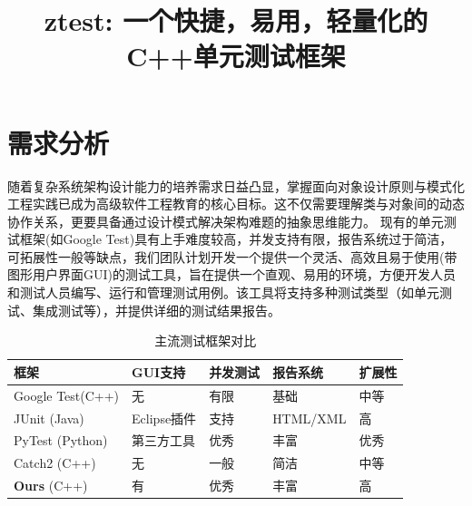 \documentclass[chinese]{article}
\title{\textbf{ztest}: 一个快捷，易用，轻量化的C++单元测试框架}
\begin{document}
\maketitle
\tableofcontents  %
\newpage
\section{需求分析}%
随着复杂系统架构设计能力的培养需求日益凸显，掌握面向对象设计原则与模式化工程实践已成为高级软件工程教育的核心目标。这不仅需要理解类与对象间的动态协作关系，更要具备通过设计模式解决架构难题的抽象思维能力。
现有的单元测试框架(如Google Test)具有上手难度较高，并发支持有限，报告系统过于简洁，可拓展性一般等缺点，我们团队计划开发一个提供一个灵活、高效且易于使用(带图形用户界面GUI)的测试工具，旨在提供一个直观、易用的环境，方便开发人员和测试人员编写、运行和管理测试用例。该工具将支持多种测试类型（如单元测试、集成测试等），并提供详细的测试结果报告。
\begin{table}[h]
    \centering
    \caption{主流测试框架对比}
    \label{tab:compare}
    \begin{tabularx}{\textwidth}{lXXXX}
        \toprule
        \textbf{框架}            & \textbf{GUI支持} & \textbf{并发测试} & \textbf{报告系统} & \textbf{扩展性} \\
        \midrule
        Google Test(C++)       & 无              & 有限            & 基础            & 中等           \\
        JUnit    (Java)        & Eclipse插件      & 支持            & HTML/XML      & 高            \\
        PyTest (Python)        & 第三方工具          & 优秀            & 丰富            & 优秀           \\
        Catch2   (C++)         & 无              & 一般            & 简洁            & 中等           \\
        \textbf{Ours}    (C++) & 有              & 优秀            & 丰富            & 高            \\
        \bottomrule
    \end{tabularx}
\end{table}
\end{document}
